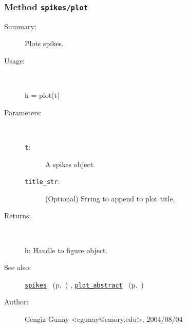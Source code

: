 \subsubsection[Method \texttt{plot}]{Method \texttt{spikes/plot}}%
%
\label{ref_spikes__plot}%
\hypertarget{ref_spikes__plot}{}%
\begin{description}
\item[Summary:]Plots spikes.
%
\item[Usage:]~%
\begin{lyxcode}%
h = plot(t)
%
\end{lyxcode}%
%
%
\item[Parameters:]~
\begin{description}%
\item[\texttt{t}:]
 A spikes object.
\item[\texttt{title\_str}:]
 (Optional) String to append to plot title.
\end{description}%
%
\item[Returns:
]~

	h: Handle to figure object.
%
%
\item[See also:]%
\hyperlink{ref_spikes}{\texttt{spikes}}%
\ (p.~\pageref{ref_spikes})%
%
, \hyperlink{ref_plot_abstract}{\texttt{plot\_abstract}}%
\ (p.~\pageref{ref_plot_abstract})%
%
%
\item[Author:]%
Cengiz Gunay <cgunay@emory.edu>, 2004/08/04
%
\end{description}
\methodline%
